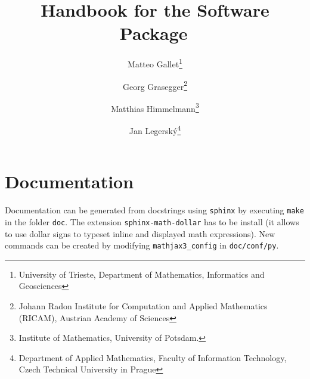 \documentclass[]{article}
\title{Handbook for the Software Package\, \raisebox{-0.15\totalheight}{\texttt{[image: icon.jpg]}}}
\author{Matteo Gallet\thanks{University of Trieste, Department of Mathematics, Informatics and Geosciences} 
	\and Georg Grasegger\thanks{Johann Radon Institute for Computation and Applied Mathematics (RICAM),
		Austrian Academy of Sciences}
	\and Matthias Himmelmann\thanks{Institute of Mathematics, University of Potsdam.}
	\and Jan Legerský\thanks{Department of Applied Mathematics, Faculty of Information Technology,
		Czech Technical University in Prague}}
\begin{document}
\maketitle


\section{Documentation}
Documentation can be generated from docstrings using \texttt{sphinx}
by executing \texttt{make} in the folder \texttt{doc}.
The extension \texttt{sphinx-math-dollar} has to be install
(it allows to use dollar signs to typeset inline and displayed math expressions).
New commands can be created by modifying \texttt{mathjax3\_config} in \texttt{doc/conf/py}.
\end{document}
